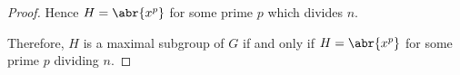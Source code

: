 \documentclass[11pt]{article}
\begin{document}
\begin{enumerate}
\begin{enumerate}[label=(\alph*)]
\begin{proof}
        Hence $H = \abr{x^p}$ for some prime $p$ which divides $n$.

        Therefore, $H$ is a maximal subgroup of $G$ if and only if $H = \abr{x^p}$ for some prime $p$ dividing $n$.
      \end{proof}
    \end{enumerate}
\end{enumerate}
\end{document}
